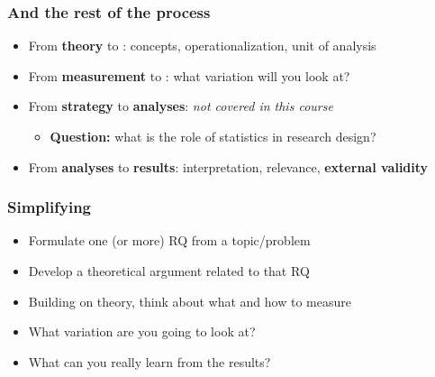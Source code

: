 \begin{frame}
\frametitle{And the rest of the process}
\centering

\begin{itemize}
  \item[$>$] From \textbf{theory} to : concepts, operationalization, unit of analysis \hfill {}
  \vspace{8pt}
  \item[$>$] From \textbf{measurement} to : what variation will you look at? \hfill {}
  \vspace{8pt}
  \item[$>$] From \textbf{strategy} to \textbf{analyses}: \textit{not covered in this course}
  \begin{itemize}
    \item \textbf{Question:} what is the role of statistics in research design?
  \end{itemize}
  \vspace{8pt}
  \item[$>$] From \textbf{analyses} to \textbf{results}: interpretation, relevance, \textbf{external validity}
\end{itemize}

\end{frame}

\begin{frame}
\frametitle{Simplifying}
\centering

\begin{itemize}
  \item[1.] Formulate one (or more) RQ from a topic/problem
  \item[2.] Develop a theoretical argument related to that RQ
  \item[3.] Building on theory, think about what and how to measure
  \item[4.] What variation are you going to look at?
  \item[5.] What can you really learn from the results?
\end{itemize}

\end{frame}

